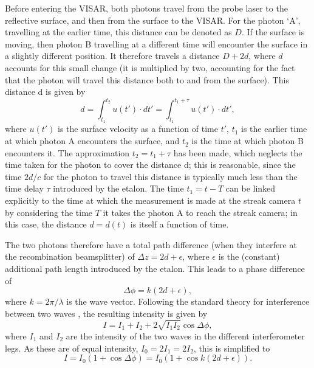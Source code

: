 Before entering the VISAR, both photons travel from the probe laser to the reflective surface, and then from the surface to the VISAR. For the photon `A', travelling at the earlier time, this distance can be denoted as $D$. If the surface is moving, then photon B travelling at a different time will encounter the surface in a slightly different position. It therefore travels a distance $D+2d$, where $d$ accounts for this small change (it is multiplied by two, accounting for the fact that the photon will travel this distance both to and from the surface). This distance d is given by \begin{equation} d = \int_{t_1}^{t_2} u(t') \cdot dt' = \int_{t_1}^{t_1 + \tau} u(t') \cdot dt',\end{equation} where $u(t')$ is the surface velocity as a function of time $t'$, $t_1$ is the earlier time at which photon A encounters the surface, and $t_2$ is the time at which photon B encounters it. The approximation $t_2 = t_1 + \tau$ has been made, which neglects the time taken for the photon to cover the distance d; this is reasonable, since the time $2d/c$ for the photon to travel this distance is typically much less than the time delay $\tau$ introduced by the etalon. The time $t_1 = t - T$ can be linked explicitly to the time at which the measurement is made at the streak camera $t$ by considering the time $T$ it takes the photon A to reach the streak camera; in this case, the distance $d = d(t)$ is itself a function of time.

The two photons therefore have a total path difference (when they interfere at the recombination beamsplitter) of $ \Delta z = 2d + \epsilon $, where $\epsilon$ is the (constant) additional path length introduced by the etalon. This leads to a phase difference of \begin{equation} \Delta\phi = k (2d + \epsilon),\end{equation} where $k = 2\pi / \lambda$ is the wave vector. Following the standard theory for interference between two waves \cite{Hecht2017}, the resulting intensity is given by  \begin{equation}I = I_1 + I_2 + 2\sqrt{I_1 I_2} \cos{\Delta \phi},\end{equation} where $I_1$ and $I_2$ are the intensity of the two waves in the different interferometer legs. As these are of equal intensity, $I_0 = 2 I_1 = 2 I_2$, this is simplified to \begin{equation} I = I_0 (1 + \cos{\Delta \phi}) = I_0 (1 + \cos{k (2d + \epsilon)}).\end{equation}

